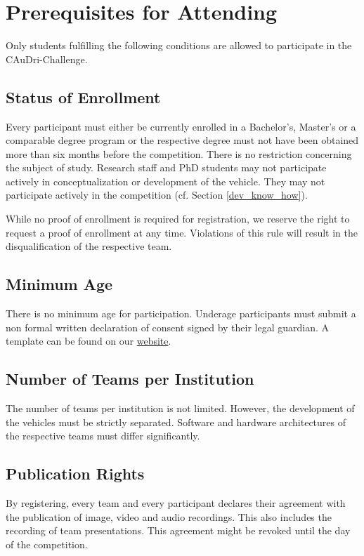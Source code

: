 \chapter{Prerequisites for Attending}

Only students fulfilling the following conditions are allowed to participate in
the CAuDri-Challenge.

\section{Status of Enrollment}

Every participant must either be currently enrolled in a Bachelor’s, Master’s
or a comparable degree program or the respective degree must not have been
obtained more than six months before the competition. There is no restriction
concerning the subject of study. Research staff and PhD students may not
participate actively in conceptualization or development of the vehicle. They
may not participate actively in the competition (cf. Section
\ref{dev_know_how}).

While no proof of enrollment is required for registration, we reserve the right
to request a proof of enrollment at any time. Violations of this rule will
result in the disqualification of the respective team.

\section{Minimum Age}

There is no minimum age for participation. Underage participants must submit a
non formal written declaration of consent signed by their legal guardian. A
template can be found on our
\href{https://caudri-challenge.de/documents/Einverst%C3%A4ndniserkl%C3%A4rung_Minderj%C3%A4hrige.pdf}{website}.
\section{Number of Teams per Institution}

The number of teams per institution is not limited. However, the development of
the vehicles must be strictly separated. Software and hardware architectures of
the respective teams must differ significantly.

\section{Publication Rights}

By registering, every team and every participant declares their agreement with
the publication of image, video and audio recordings. This also includes the
recording of team presentations. This agreement might be revoked until the day
of the competition.